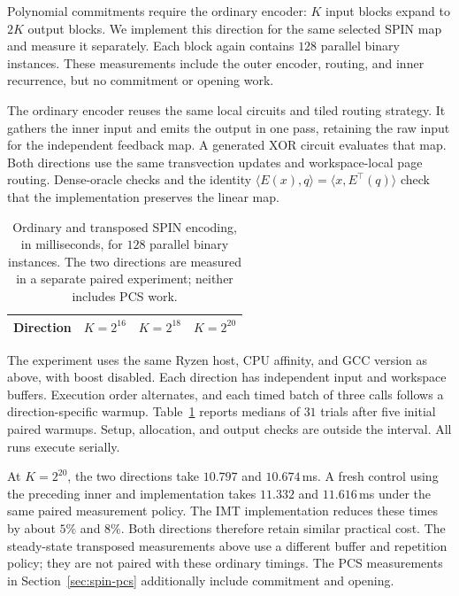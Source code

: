 Polynomial commitments require the ordinary encoder: $K$ input blocks
expand to $2K$ output blocks. We implement this direction for the same
selected SPIN map and measure it separately. Each block again contains
$128$ parallel binary instances. These measurements include the outer
encoder, routing, and inner recurrence, but no commitment or opening work.

The ordinary encoder reuses the same local circuits and tiled routing
strategy. It gathers the inner input and emits the output in one pass,
retaining the raw input for the independent feedback map. A generated XOR
circuit evaluates that map. Both directions use the same transvection
updates and workspace-local page routing. Dense-oracle checks and the identity
$\langle E(x),q\rangle=\langle x,E^\top(q)\rangle$ check that the
implementation preserves the linear map.

\begin{table}[tb]
\centering
\caption{Ordinary and transposed SPIN encoding, in milliseconds, for
$128$ parallel binary instances. The two directions are measured in a
separate paired experiment; neither includes PCS work.}
\label{tab:ordinary-encoding}
\begin{tabular}{@{}lrrr@{}}
\toprule
Direction & $K=2^{16}$ & $K=2^{18}$ & $K=2^{20}$ \\
\midrule

\end{tabular}
\end{table}

The experiment uses the same Ryzen host, CPU affinity, and GCC version
as above, with boost disabled. Each direction has independent input and
workspace buffers. Execution order alternates, and each timed batch of
three calls follows a direction-specific warmup. Table~\ref{tab:ordinary-encoding}
reports medians of $31$ trials after five initial paired warmups.
Setup, allocation, and output checks are outside the interval.
All runs execute serially.

At $K=2^{20}$, the two directions take $10.797$ and $10.674$\,ms.
A fresh control using the preceding inner
and implementation takes $11.332$ and $11.616$\,ms under the same paired
measurement policy. The IMT implementation reduces these times by about
$5\%$ and $8\%$. Both directions therefore retain similar practical cost.
The steady-state transposed measurements above use a different buffer
and repetition policy; they are not paired with these ordinary timings.
The PCS measurements in Section~\ref{sec:spin-pcs} additionally include commitment and opening.

